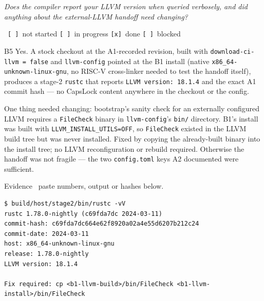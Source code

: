 \documentclass[11pt,a4paper]{article}
\newcommand{\lbl}[1]{\vspace{5pt}\noindent{\scriptsize\bfseries\color{mute}\MakeUppercase{#1}}\par\vspace{1pt}}
\begin{document}
\lbl{You will be asked}
\begin{askbox}
\emph{Does the compiler report your LLVM version when queried verbosely, and did anything about the external-LLVM handoff need changing?}
\end{askbox}
\ \texttt{[\ ]}~not started \quad
  \texttt{[\ ]}~in progress \quad \texttt{[x]}~done \quad
  \texttt{[\ ]}~blocked\par\vspace{3pt}
\begin{answerbox}{B5}
Yes. A stock checkout at the A1-recorded revision, built with \texttt{download-ci-llvm = false} and \texttt{llvm-config} pointed at the B1 install (native \texttt{x86\_64-unknown-linux-gnu}, no RISC-V cross-linker needed to test the handoff itself), produces a stage-2 \texttt{rustc} that reports \texttt{LLVM version: 18.1.4} and the exact A1 commit hash --- no CapsLock content anywhere in the checkout or the config.

One thing needed changing: bootstrap's sanity check for an externally configured LLVM requires a \texttt{FileCheck} binary in \texttt{llvm-config}'s \texttt{bin/} directory. B1's install was built with \texttt{LLVM\_INSTALL\_UTILS=OFF}, so \texttt{FileCheck} existed in the LLVM build tree but was never installed. Fixed by copying the already-built binary into the install tree; no LLVM reconfiguration or rebuild required. Otherwise the handoff was not fragile --- the two \texttt{config.toml} keys A2 documented were sufficient.

{\scriptsize\color{mute}Evidence \textemdash\ paste numbers, output or hashes below.}
\begin{verbatim}
$ build/host/stage2/bin/rustc -vV
rustc 1.78.0-nightly (c69fda7dc 2024-03-11)
commit-hash: c69fda7dc664e62f8920a02a4e55d6207b212c24
commit-date: 2024-03-11
host: x86_64-unknown-linux-gnu
release: 1.78.0-nightly
LLVM version: 18.1.4

Fix required: cp <b1-llvm-build>/bin/FileCheck <b1-llvm-install>/bin/FileCheck
\end{verbatim}
\end{answerbox}

\vspace{10pt}
\end{document}
